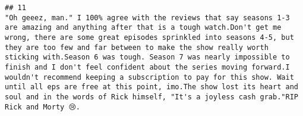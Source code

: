 \documentclass[
]{article}
\begin{document}
\begin{verbatim}
## 11                                                                                                                                                                                                                                                                                                                                                                                                                                                                                                                                                                                                                                                                                                                                                                                                                                                                                                                                                                                                                                                                                                                                                                                                                                                                                                                                                                                                                                                                                                                                                                                                                                                                                                                                                                                                "Oh geeez, man." I 100% agree with the reviews that say seasons 1-3 are amazing and anything after that is a tough watch.Don't get me wrong, there are some great episodes sprinkled into seasons 4-5, but they are too few and far between to make the show really worth sticking with.Season 6 was tough. Season 7 was nearly impossible to finish and I don't feel confident about the series moving forward.I wouldn't recommend keeping a subscription to pay for this show. Wait until all eps are free at this point, imo.The show lost its heart and soul and in the words of Rick himself, "It's a joyless cash grab."RIP Rick and Morty 😢.

\end{verbatim}
\end{document}
